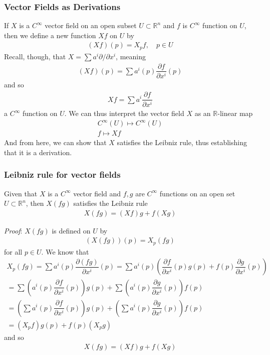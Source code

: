 \documentclass{article}
\newcommand{\R}{\mathbb{R}}
\newcommand{\Cinfty}{C^{\infty}}
\begin{document}
	\subsubsection*{Vector Fields as Derivations}
	If $X$ is a $\Cinfty$ vector field on an open subset $U \subset \R^n$ and $f$ is $\Cinfty$ function on $U$, then we define a new function $Xf$ on $U$ by
	\begin{gather*}
		(Xf)(p) = X_p f, \quad p \in U
	\end{gather*}
	Recall, though, that $X = \sum a^i \partial / \partial x^i$, meaning
	\begin{gather*}
		(Xf)(p) = \sum a^i(p) \dfrac{\partial f}{\partial x^i}(p)
	\end{gather*}
	and so
	\begin{gather*}
		Xf = \sum a^i \dfrac{\partial f}{\partial x^i}
	\end{gather*}
	a $\Cinfty$ function on $U$. We can thus interpret the vector field $X$ as an $\R$-linear map
	\begin{gather*}
		\Cinfty(U) \mapsto \Cinfty(U) \\
		f \mapsto Xf
	\end{gather*}
	And from here, we can show that $X$ satisfies the Leibniz rule, thus establishing that it is a derivation.	
	
	\subsubsection*{Leibniz rule for vector fields}
	Given that $X$ is a $\Cinfty$ vector field and $f, g$ are $\Cinfty$ functions on an open set $U \subset \R^n$, then $X(fg)$ satisfies the Leibniz rule
	\begin{gather*}
		X(fg) = (Xf)g + f(Xg)
	\end{gather*}
	
	\noindent \textit{Proof}: $X(fg)$ is defined on $U$ by
	\begin{gather*}
		(X(fg))(p) = X_p(fg)
	\end{gather*}
	for all $p \in U$. We know that
	\begin{gather*}
		X_p(fg) = \sum a^i(p) \dfrac{\partial (fg)}{\partial x^i} (p) = \sum a^i(p) \left( \dfrac{\partial f}{\partial x^i} (p) g(p) + f(p) \dfrac{\partial g}{\partial x^i} (p) \right) \\
		= \sum \left( a^i(p) \dfrac{\partial f}{\partial x^i} (p) \right) g(p) + \sum \left( a^i(p) \dfrac{\partial g}{\partial x^i} (p) \right) f(p) \\
		= \left( \sum a^i(p) \dfrac{\partial f}{\partial x^i} (p) \right) g(p) + \left( \sum a^i(p) \dfrac{\partial g}{\partial x^i} (p) \right) f(p) \\
		= (X_p f) g(p) + f(p) (X_p g)
	\end{gather*}
	and so 
	\begin{gather*}
		X(fg) = (Xf)g + f(Xg)
	\end{gather*}
	
\end{document}
